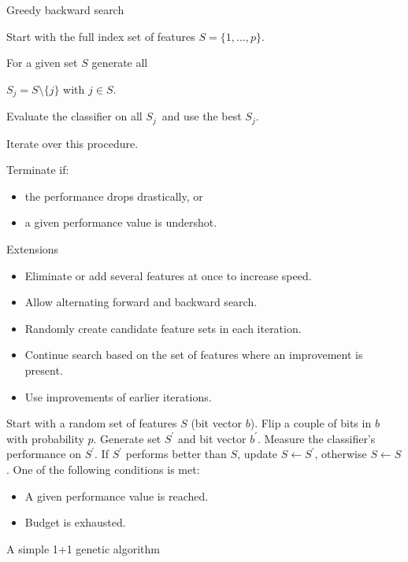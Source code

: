 \documentclass[11pt,compress,t,notes=noshow, xcolor=table]{beamer}
\begin{document}
  \begin{vbframe}{Greedy backward search}


    \begin{blocki}{}
      \item Start with the full index set of features $S = \{1, \ldots, p\}$.
      \item For a given set $S$ generate all

      $S_j = S \setminus\{j\}$ with $j \in S$.
      \item Evaluate the classifier on all $S_j$\
        and use the best $S_j$.
      \item Iterate over this procedure.
      \item Terminate if:
        \begin{itemize}
          \item the performance drops drastically, or
          \item a given performance value is undershot.
        \end{itemize}
      \end{blocki}
    
  \end{vbframe}

  \begin{vbframe}{Extensions}

    \begin{itemize}
      \setlength{\itemsep}{1.0em}
      \item Eliminate or add several features at once to increase speed.
      \item Allow alternating forward and backward search.
      \item Randomly create candidate feature sets in each iteration.
      \item Continue search based on the set of features where an improvement is present.
      \item Use improvements of earlier iterations.
    \end{itemize}

    \framebreak

    \begin{algorithm}[H]
    \begin{algorithmic}[1]
      \State Start with a random set of features $S$ (bit vector $b$).
      \Repeat
      \State Flip a couple of bits in $b$ with probability $p$.
      \State Generate set $S^\prime$ and bit vector $b^\prime$.
      \State Measure the classifier's performance on $S^\prime$.
      \State If $S^\prime$ performs better than $S$, update $S \leftarrow S^\prime$, otherwise $S \leftarrow S$.
      \Until One of the following conditions is met:
        \begin{itemize}
          \item A given performance value is reached.
          \item Budget is exhausted.
        \end{itemize}
        \caption{A simple 1+1 genetic algorithm}
    \end{algorithmic}
    \end{algorithm}

    \end{vbframe}
\end{document}
